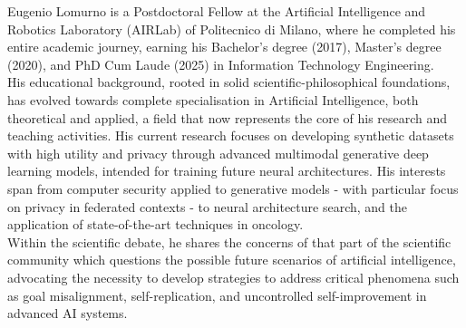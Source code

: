 
\begin{flushleft}
  \vspace{-2.0mm}
Eugenio Lomurno is a Postdoctoral Fellow at the Artificial Intelligence and Robotics Laboratory (AIRLab) of Politecnico di Milano, where he completed his entire academic journey, earning his Bachelor's degree (2017), Master's degree (2020), and PhD Cum Laude (2025) in Information Technology Engineering.\\
His educational background, rooted in solid scientific-philosophical foundations, has evolved towards complete specialisation in Artificial Intelligence, both theoretical and applied, a field that now represents the core of his research and teaching activities.
His current research focuses on developing synthetic datasets with high utility and privacy through advanced multimodal generative deep learning models, intended for training future neural architectures. His interests span from computer security applied to generative models - with particular focus on privacy in federated contexts - to neural architecture search, and the application of state-of-the-art techniques in oncology.\\
Within the scientific debate, he shares the concerns of that part of the scientific community which questions the possible future scenarios of artificial intelligence, advocating the necessity to develop strategies to address critical phenomena such as goal misalignment, self-replication, and uncontrolled self-improvement in advanced AI systems. 
\end{flushleft}
